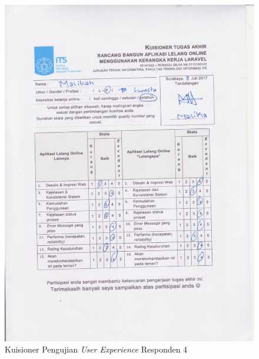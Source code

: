 \begin{figure}[H]
	\centering
	\includegraphics[width=.9\textwidth]{images/bab5/ujipengguna/4.jpg}
	\caption{Kuisioner Pengujian \textit{User Experience} Responden 4}
	\label{quest-4}
\end{figure}
